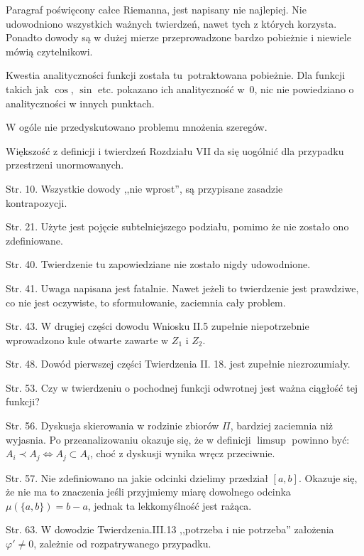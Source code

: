 \documentclass[a4paper,11pt]{article}
\begin{document}
\start Paragraf poświęcony całce Riemanna, jest napisany nie
najlepiej. Nie udowodniono wszystkich ważnych twierdzeń, nawet tych z
których korzysta. Ponadto dowody są w dużej mierze przeprowadzone
bardzo pobieżnie i niewiele mówią czytelnikowi.


\start Kwestia analityczności funkcji została tu~potraktowana
pobieżnie. Dla funkcji takich jak $\cos$, $\sin$ etc. pokazano ich
analityczność w~0, nic nie powiedziano o analityczności w innych
punktach.

\vspace{\spaceFour}


\start W ogóle nie przedyskutowano problemu mnożenia szeregów.


\start Większość z definicji i twierdzeń Rozdziału VII da się uogólnić
dla przypadku przestrzeni unormowanych.

\start Str. 10. Wszystkie dowody ,,nie wprost'', są przypisane
zasadzie \\ kontrapozycji.

\start Str. 21. Użyte jest pojęcie subtelniejszego podziału, pomimo że
nie zostało ono zdefiniowane.

\start Str. 40. Twierdzenie tu zapowiedziane nie zostało nigdy
udowodnione.


\start Str. 41. Uwaga napisana jest fatalnie. Nawet jeżeli to
twierdzenie jest prawdziwe, co nie jest oczywiste, to sformułowanie,
zaciemnia cały problem.

\start Str. 43. W drugiej części dowodu Wniosku II.5 zupełnie
niepotrzebnie wprowadzono kule otwarte zawarte w $Z_{ 1 }$ i
$Z_{ 2 }$.

\start Str. 48. Dowód pierwszej części Twierdzenia II. 18. jest
zupełnie niezrozumiały.

\start Str. 53. Czy w twierdzeniu o pochodnej funkcji odwrotnej jest
ważna ciągłość tej funkcji?

\start Str. 56. Dyskusja skierowania w rodzinie zbiorów $\Pi$, bardziej
zaciemnia niż wyjasnia. Po przeanalizowaniu okazuje się, że w
definicji $\limsup$ powinno być: \\
$A_{ i } \prec A_{ j }\Leftrightarrow A_{ j } \subset A_{ i }$, choć z dyskusji wynika wręcz
przeciwnie.

\start Str. 57. Nie zdefiniowano na jakie odcinki dzielimy przedział
$[ a, b ]$. Okazuje się, że nie ma to znaczenia jeśli przyjmiemy miarę
dowolnego odcinka $\mu ( \{ a, b \} ) = b - a$, jednak ta
lekkomyślność jest rażąca.

\start Str. 63. W dowodzie Twierdzenia.III.13 ,,potrzeba i nie
potrzeba'' założenia $\varphi' \neq 0$, zależnie od rozpatrywanego
przypadku.
\end{document}
